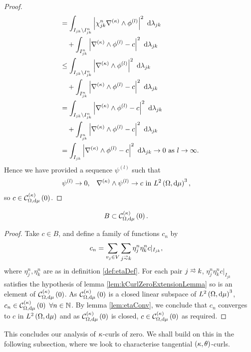 \begin{proof}
\begin{align*}
		&= \int_{I_{jk}\setminus I_{jk}^n}\left\lvert \chi_{jk}^n\nabla_{}^{(\kappa)}\wedge\phi^{(l)} \right\rvert^2 \ \mathrm{d}\lambda_{jk} \\
		&\quad + \int_{I_{jk}^n}\left\lvert \nabla_{}^{(\kappa)}\wedge\phi^{(l)} - c \right\rvert^2 \ \mathrm{d}\lambda_{jk} \\
		&\leq \int_{I_{jk}\setminus I_{jk}^n}\left\lvert \nabla_{}^{(\kappa)}\wedge\phi^{(l)} \right\rvert^2 \ \mathrm{d}\lambda_{jk} \\
		&\quad + \int_{I_{jk}^n}\left\lvert \nabla_{}^{(\kappa)}\wedge\phi^{(l)} - c \right\rvert^2 \ \mathrm{d}\lambda_{jk} \\
		&= \int_{I_{jk}\setminus I_{jk}^n}\left\lvert \nabla_{}^{(\kappa)}\wedge\phi^{(l)} - c \right\rvert^2 \ \mathrm{d}\lambda_{jk} \\
		&\quad + \int_{I_{jk}^n}\left\lvert \nabla_{}^{(\kappa)}\wedge\phi^{(l)} - c \right\rvert^2 \ \mathrm{d}\lambda_{jk} \\
		&= \int_{I_{jk}}\left\lvert \nabla_{}^{(\kappa)}\wedge\phi^{(l)} - c \right\rvert^2 \ \mathrm{d}\lambda_{jk} \rightarrow 0 \ \text{as} \ l \rightarrow\infty.
	\end{align*}
	Hence we have provided a sequence $\psi^{(l)}$ such that
	\begin{align*}
		\psi^{(l)} \rightarrow 0, &\quad \nabla_{}^{(\kappa)}\wedge\psi^{(l)} \rightarrow c \text{ in } L^{2}\left( \Omega,\mathrm{d}\mu \right)^3,
	\end{align*}
	so $c\in\mathcal{C}_{ \Omega, \mathrm{d}\mu}^{(\kappa)}\left( 0 \right)$.
\end{proof}

\begin{lemma} \label{lem:BInkCurlZero}
	\begin{align*}
		B &\subset \mathcal{C}_{ \Omega, \mathrm{d}\mu}^{(\kappa)}\left( 0 \right).
	\end{align*}
\end{lemma}
\begin{proof}
	Take $c\in B$, and define a family of functions $c_n$ by
	\begin{align*}
		c_n &= \sum_{v_j\in V}\sum_{j\conLeft k}\eta_j^n \eta_k^n c\vert_{I_{jk}},
	\end{align*}
	where $\eta_j^n, \eta_k^n$ are as in definition \ref{def:etaDef}.
	For each pair $j\conLeft k$, $\eta_j^n \eta_k^n c\vert_{I_{jk}}$ satisfies the hypothesis of lemma \ref{lem:kCurlZeroExtensionLemma} so is an element of $\mathcal{C}_{ \Omega, \mathrm{d}\mu}^{(\kappa)}\left( 0 \right)$.
	As $\mathcal{C}_{ \Omega, \mathrm{d}\mu}^{(\kappa)}\left( 0 \right)$ is a closed linear subspace of $L^{2}\left( \Omega,\mathrm{d}\mu \right)^3$, $c_n\in\mathcal{C}_{ \Omega, \mathrm{d}\mu}^{(\kappa)}\left( 0 \right) \ \forall n\in\mathbb{N}$.
	By lemma \ref{lem:etaConv}, we conclude that $c_n$ converges to $c$ in $L^{2}\left( \Omega,\mathrm{d}\mu \right)$ and as $\mathcal{C}_{ \Omega, \mathrm{d}\mu}^{(\kappa)}\left( 0 \right)$ is closed, $c\in\mathcal{C}_{ \Omega, \mathrm{d}\mu}^{(\kappa)}\left( 0 \right)$ as required.
\end{proof}

This concludes our analysis of $\kappa$-curls of zero.
We shall build on this in the following subsection, where we look to characterise tangential $\left( \kappa, \theta \right)$-curls.


